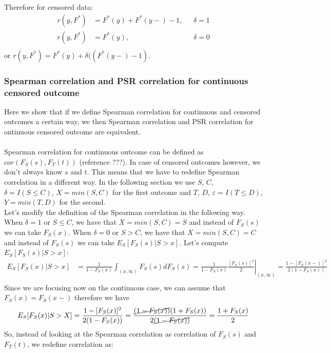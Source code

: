 \documentclass[]{article}
\let\epsilon\varepsilon
\begin{document}
Therefore for censored data:
	$$
	\begin{aligned}
		r(y, F^*) &= F^*(y) + F^*(y-) - 1,~~~&\delta = 1 \\
		r(y, F^*) &= F^*(y) ,~~~&\delta = 0 \\
	\end{aligned}
	$$
or $r(y, F^*) = F^*(y) + \delta((F^*(y-) - 1)$.

\subsubsection{Spearman correlation and PSR correlation for continuous censored outcome}
Here we show that if we define Spearman correlation for continuous and censored outcomes a certain way, we then Spearman correlation and PSR correlation for ontinuous censored outcome are equivalent.\\
~\\
Spearman correlation for continuous outcome can be defined as $cor(F_S(s), F_T(t))$ (reference ???). In case of censored outcomes however, we don't always know $s$ and $t$. This means that we have to redefine Spearman correlation in a different way. In the following section we use $S$, $C$, $\delta=I(S\leq C)$, $X = min(S, C)$ for the first outcome and $T$, $D$, $\epsilon=I(T\leq D)$, $Y = min(T, D)$ for the second.\\
Let's modify the definition of the Spearman correlation in the following way. When $\delta = 1$ or $S\leq C$, we have that $X = min(S, C)=S$ and instead of $F_S(s)$ we can take $F_S(x)$. When $\delta = 0$ or $S > C$, we have that $X = min(S, C)=C$ and instead of $F_S(s)$ we can take $E_S[F_S(s)|S>x]$. Let's compute $E_S[F_S(s)|S>x]$:
	$$
	\begin{aligned}
		E_S[F_S(x)|S>x] &= \frac{1}{1-F_S(x)}\int_{(x, \infty)} F_S(s)dF_S(s) = \frac{1}{1-F_S(x)} \left.\frac{ [F_S(s)]^2}{2}\right|_{(x, \infty)} = \frac{1-[F_S(x-)]^2}{2(1-F_S(x))} \\
	\end{aligned}
	$$
Since we are focusing now on the continuous case, we can assume that $F_S(x)=F_S(x-)$ therefore we have
	$$
	\begin{aligned}
		E_S[F_S(x)|S>X] &=\frac{1-[F_S(x)]^2}{2(1-F_S(x))}=\frac{\cancel{(1-F_S(x))}(1+F_S(x))}{2\cancel{(1-F_S(x))}}  = \frac{1+F_S(x)}{2} \\
	\end{aligned}
	$$
So, instead of looking at the Spearman correlation as correlation of $F_S(s)$ and $F_T(t)$, we redefine correlation as:
\end{document}
